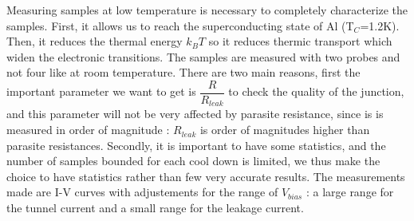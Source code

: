                 Measuring samples at low temperature is necessary to completely characterize the samples. First, it allows us to reach the superconducting state of Al (T$_C$=1.2K). Then, it reduces the thermal energy $k_BT$ so it reduces thermic transport which widen the electronic transitions.
               The samples are measured with two probes and not four like at room temperature. There are two main reasons, first the important parameter we want to get is $\dfrac{R}{R_{leak}}$ to check the quality of the junction, and this parameter will not be very affected by parasite resistance, since is is measured in order of magnitude : $R_{leak}$ is order of magnitudes higher than parasite resistances. Secondly, it is important to have some statistics, and the number of samples bounded for each cool down is limited, we thus make the choice to have statistics rather than few very accurate results. The measurements made are I-V curves with adjustements for the range of $V_{bias}$ : a large range for the tunnel current and a small range for the leakage current.
                
                                          
%         
                
                
                
                
                
                
            
